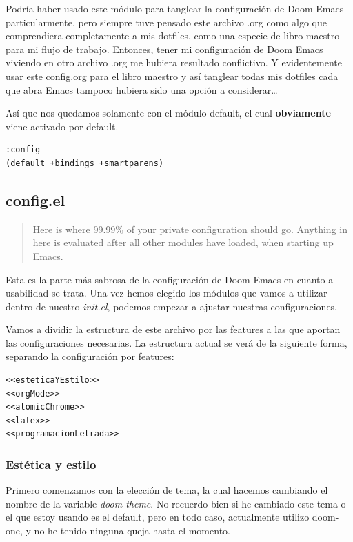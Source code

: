 \documentclass[11pt]{article}
\begin{document}
Podría haber usado este módulo para tanglear la configuración de Doom Emacs particularmente, pero siempre tuve pensado este archivo .org como algo que comprendiera completamente a mis dotfiles, como una especie de libro maestro para mi flujo de trabajo. Entonces, tener mi configuración de Doom Emacs viviendo en otro archivo .org me hubiera resultado conflictivo. Y evidentemente usar este config.org para el libro maestro y así tanglear todas mis dotfiles cada que abra Emacs tampoco hubiera sido una opción a considerar\ldots{}

Así que nos quedamos solamente con el módulo default, el cual \textbf{obviamente} viene activado por default.

\begin{verbatim}
:config
(default +bindings +smartparens)

\end{verbatim}
\subsection{config.el}
\label{sec:org766ad14}

\begin{quote}
Here is where 99.99\% of your private configuration should go. Anything in here is evaluated after all other modules have loaded, when starting up Emacs.
\end{quote}

Esta es la parte más sabrosa de la configuración de Doom Emacs en cuanto a usabilidad se trata. Una vez hemos elegido los módulos que vamos a utilizar dentro de nuestro \emph{init.el}, podemos empezar a ajustar nuestras configuraciones.

Vamos a dividir la estructura de este archivo por las features a las que aportan las configuraciones necesarias. La estructura actual se verá de la siguiente forma, separando la configuración por features:

\begin{verbatim}
<<esteticaYEstilo>>
<<orgMode>>
<<atomicChrome>>
<<latex>>
<<programacionLetrada>>
\end{verbatim}
\subsubsection{Estética y estilo}
\label{sec:org6633087}

Primero comenzamos con la elección de tema, la cual hacemos cambiando el nombre de la variable \emph{doom-theme}. No recuerdo bien si he cambiado este tema o el que estoy usando es el default, pero en todo caso, actualmente utilizo doom-one, y no he tenido ninguna queja hasta el momento.
\end{document}
